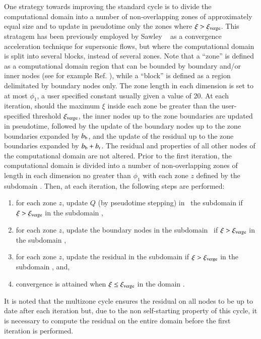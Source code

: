 One strategy towards improving the standard cycle is to divide the computational
domain into a number of non-overlapping zones of approximately equal size
and to update in pseudotime only the zones where $\xi>{\xi_{\rm verge}}$.
This stratagem has been previously employed
by Sawley \etal\ \cite{misc:1994:sawley}
as a convergence acceleration technique for supersonic flows, but where the
computational domain is split into several blocks, instead of several zones.
Note that a ``zone'' is defined as a computational domain region that
can be bounded by boundary and/or inner nodes (see for example Ref.
\cite{jcp:1994:rosenfeld}),
while a ``block'' is defined as a region delimitated  by boundary nodes only.
The zone length in each dimension is set to at most $\phi_1$, a user
specified constant usually given a value of 20.
At each iteration, should the maximum $\xi$ inside each zone be greater
than the user-specified threshold ${\xi_{\rm verge}}$, the inner nodes up to the
zone boundaries are updated in pseudotime,
followed by the update of the boundary nodes up to the zone boundaries expanded by ${b_{\rm b}}$,
and the update of the residual up to the zone boundaries expanded by ${b_{\rm b}}+{b_{\rm r}}$.
The residual and properties of all other nodes of the computational domain
are not altered. Prior to the first iteration,
the computational domain is divided into a number of non-overlapping zones
of length in each dimension no greater than $\phi_1$ with
each zone $z$ defined by the subdomain .
Then, at each iteration, the following steps are performed:
%
\begin{enumerate}
  \item{for each zone $z$, update $Q$ (by pseudotime stepping) in \
        the subdomain 
	if $\xi > {\xi_{\rm verge}}$ in the subdomain ,}
  \item{for each zone $z$, update the boundary nodes in the subdomain\
	if $\xi > {\xi_{\rm verge}}$ in the subdomain ,}
  \item{for each zone $z$, update the residual in the subdomain
        \subdomain{\forall i}{X^{z,\loops}_i-\bb-\br}{X^{z,\loope}_i+\bb+\br}
	if $\xi > {\xi_{\rm verge}}$ in the subdomain , and, }
  \item{convergence is attained when $\xi \leq {\xi_{\rm verge}}$ in the domain .}
\end{enumerate}
%
It is noted that the multizone cycle ensures
the residual on all nodes to be up to date after each iteration but,
due to the non self-starting property of this cycle, it is
necessary to compute the residual on the entire domain before the first iteration
is performed.




